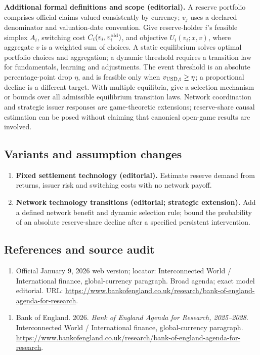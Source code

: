 \documentclass[11pt,a4paper]{article}
\begin{document}
\textbf{Additional formal definitions and scope (editorial).} A reserve portfolio comprises official claims valued consistently by currency; \(v_j\) uses a declared denominator and valuation-date convention. Give reserve-holder \(i\)'s feasible simplex \(A_i\), switching cost \(C_i(v_i,v_i^{\rm old})\), and objective \(U_i(v_i;x,v)\), where aggregate \(v\) is a weighted sum of choices. A static equilibrium solves optimal portfolio choices and aggregation; a dynamic threshold requires a transition law for fundamentals, learning and adjustments. The event threshold is an absolute percentage-point drop \(\eta\), and is feasible only when \(v_{\rm USD,t}\geq\eta\); a proportional decline is a different target. With multiple equilibria, give a selection mechanism or bounds over all admissible equilibrium transition laws. Network coordination and strategic issuer responses are game-theoretic extensions; reserve-share causal estimation can be posed without claiming that canonical open-game results are involved.
\subsection*{Variants and assumption changes}
\begin{enumerate}
\item \textbf{Fixed settlement technology (editorial).} Estimate reserve demand from returns, issuer risk and switching costs with no network payoff.
\item \textbf{Network technology transitions (editorial; strategic extension).} Add a defined network benefit and dynamic selection rule; bound the probability of an absolute reserve-share decline after a specified persistent intervention.
\end{enumerate}
\subsection*{References and source audit}
\begin{enumerate}
\item Official January 9, 2026 web version; locator: Interconnected World / International finance, global-currency paragraph. Broad agenda; exact model editorial. URL: \url{https://www.bankofengland.co.uk/research/bank-of-england-agenda-for-research}.
\end{enumerate}
\begin{enumerate}\raggedright
\item\hypertarget{definitions:source:30007616:1}{} Bank of England. 2026. \emph{Bank of England Agenda for Research, 2025–2028}. Interconnected World / International finance, global-currency paragraph.
\url{https://www.bankofengland.co.uk/research/bank-of-england-agenda-for-research}.
\end{enumerate}
\end{document}

